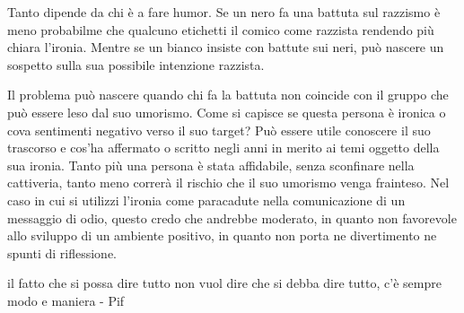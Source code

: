 \documentclass[12pt]{book} %
\begin{document}
\begin{mdframed}[linewidth=1pt]
Tanto dipende da chi è a fare humor. Se un nero fa una battuta sul razzismo è meno probabilme che qualcuno etichetti il comico come razzista rendendo più chiara l'ironia. Mentre se un bianco insiste con battute sui neri, può nascere un sospetto sulla sua
possibile intenzione razzista.

Il problema può nascere quando chi fa la battuta non coincide con il gruppo che può essere leso dal suo umorismo. Come
si capisce se questa persona è ironica o cova sentimenti negativo verso il suo target? Può essere utile conoscere il
suo trascorso e cos'ha affermato o scritto negli anni in merito ai temi oggetto della sua ironia.
Tanto più una persona è stata affidabile, senza sconfinare nella cattiveria, tanto meno correrà il rischio che il suo
umorismo venga frainteso. Nel caso in cui si utilizzi l'ironia come paracadute nella comunicazione
di un messaggio di odio, questo credo che andrebbe moderato, in quanto non favorevole allo sviluppo di un ambiente
positivo, in quanto non porta ne divertimento ne spunti di
riflessione.

il fatto che si possa dire tutto non vuol dire che si debba dire tutto, c'è sempre modo e maniera -
Pif
\end{mdframed}
\end{document}
